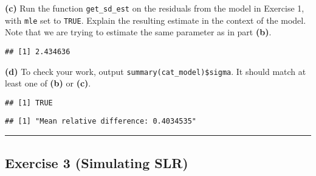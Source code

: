 \documentclass[]{article}
\newenvironment{Shaded}{\begin{snugshade}}{\end{snugshade}}
\newcommand{\KeywordTok}[1]{\textcolor[rgb]{0.13,0.29,0.53}{\textbf{#1}}}
\newcommand{\NormalTok}[1]{#1}
\newcommand{\OperatorTok}[1]{\textcolor[rgb]{0.81,0.36,0.00}{\textbf{#1}}}
\newcommand{\OtherTok}[1]{\textcolor[rgb]{0.56,0.35,0.01}{#1}}
\begin{document}
\textbf{(c)} Run the function \texttt{get\_sd\_est} on the residuals
from the model in Exercise 1, with \texttt{mle} set to \texttt{TRUE}.
Explain the resulting estimate in the context of the model. Note that we
are trying to estimate the same parameter as in part \textbf{(b)}.

\begin{Shaded}
\end{Shaded}

\begin{verbatim}
## [1] 2.434636
\end{verbatim}

\textbf{(d)} To check your work, output
\texttt{summary(cat\_model)\$sigma}. It should match at least one of
\textbf{(b)} or \textbf{(c)}.

\begin{Shaded}
\end{Shaded}

\begin{verbatim}
## [1] TRUE
\end{verbatim}

\begin{Shaded}
\end{Shaded}

\begin{verbatim}
## [1] "Mean relative difference: 0.4034535"
\end{verbatim}

\begin{center}\rule{0.5\linewidth}{0.5pt}\end{center}

\hypertarget{exercise-3-simulating-slr}{%
\subsection{Exercise 3 (Simulating
SLR)}\label{exercise-3-simulating-slr}}
\end{document}
